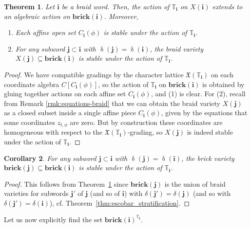 \documentclass[a4paper, 11pt]{amsart}
\newcommand{\brick}{\mathbf{brick}}
\newcommand{\charlat}{\mathfrak{X}}
\newcommand{\word}[1]{\mathbf{#1}}
\DeclareMathOperator{\dem}{\delta}
\newcommand{\dil}[1]{\mathbb{T}_{#1}}
\newtheorem{theorem}{Theorem}[section]
\newtheorem{corollary}[theorem]{Corollary}%
\theoremstyle{definition}
\begin{document}
\begin{theorem}\label{thm:action-extends}
    Let $\word{i}$ be a braid word. Then, the action of $\dil{\word{i}}$ on $X(\word{i})$ extends to an algebraic action on $\brick(\word{i})$. Moreover,
    \begin{enumerate}
        \item Each affine open set $C_{\word{i}}(\phi)$ is stable under the action of $\dil{\word{i}}$.
        \item For any subword $\word{j}\subset \word{i}$  with $\dem(\word{j}) = \dem(\word{i})$, the braid variety $X(\word{j}) \subseteq \brick(\word{i})$ is stable under the action of $\dil{\word{i}}$. 
    \end{enumerate}
\end{theorem}
\begin{proof}
We have compatible gradings by the character lattice $\charlat(\dil{\word{i}})$ on each coordinate algebra $C[C_{\word{i}}(\phi)]$, so the action of $\dil{\word{i}}$ on $\brick(\word{i})$ is obtained by gluing together actions on each affine set $C_{\word{i}}(\phi)$, and (1) is clear. For (2), recall from Remark \ref{rmk:equations-braid} that we can obtain the braid variety $X(\word{j})$ as a closed subset inside a single affine piece $C_{\word{i}}(\phi)$, given by the equations that some coordinates $z_{t, \phi}$ are zero. But by construction these coordinates are homogeneous with respect to the $\charlat(\dil{\word{i}})$-grading, so $X(\word{j})$ is indeed stable under the action of $\dil{\word{i}}$. 
\end{proof}

\begin{corollary}
\label{cor:bricks_subwrods_stable}
For any subword $\word{j}\subset\word{i}$ with $\dem(\word{j}) = \dem(\word{i})$, the brick variety $\brick(\word{j}) \subseteq \brick(\word{i})$ is stable under the action of $\dil{\word{i}}$.
\end{corollary}

\begin{proof}
This follows from Theorem~\ref{thm:action-extends} since $\brick(\word{j})$ is the union of braid varieties for subwords $\word{j}'$  of $\word{j}$ (and so of $\word{i}$) with $\delta(\word{j}') = \delta(\word{j})$ (and so with $\delta(\word{j}') = \delta(\word{i})$), cf. Theorem~\ref{thm:escobar_stratification}.
\end{proof}






Let us now  explicitly find the set $\brick(\word{i})^{\dil{\word{i}}}$. 
\end{document}
